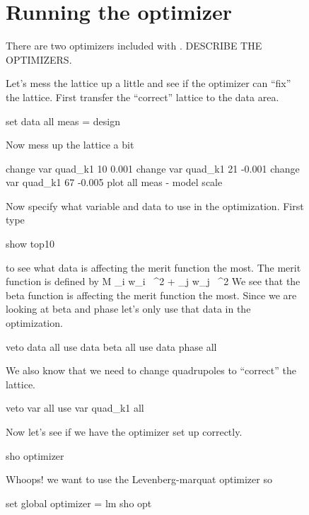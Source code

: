 \documentclass{report}
\begin{document}
\begin{figure}
\chapter{Running the optimizer}
\label{c:optimizer}

There are two optimizers included with \tao. DESCRIBE THE OPTIMIZERS.

Let's mess the lattice up a little and see if the optimizer can ``fix'' the
lattice. First transfer the ``correct'' lattice to the  data area.
\begin{example}
  set data all meas = design
\end{example}
Now mess up the lattice a bit
\begin{example}
  change var quad\_k1 10 0.001
  change var quad\_k1 21 -0.001
  change var quad\_k1 67 -0.005
  plot all meas - model
  scale
\end{example}

Now specify what variable and data to use in the optimization. First type
\begin{example}
  show top10
\end{example}
to see what data is affecting the merit function the most. The merit function is
defined by
\Begineq
  {\cal M} \equiv \sum\_{i} w\_i \,
    ^2 + 
  \sum\_{j} w\_j \,
    ^2
  \label{m1}
\Endeq
We see that the beta function is affecting the merit function the most. Since we
are looking at beta and phase let's only use that data in the optimization.
\begin{example}
  veto data all
  use  data beta all
  use  data phase all
\end{example}
We also know that we need to change quadrupoles to ``correct'' the lattice.
\begin{example}
  veto var all
  use var quad\_k1 all
\end{example}
Now let's see if we have the optimizer set up correctly.
\begin{example}
  sho optimizer
\end{example}
Whoops! we want to use the Levenberg-marquat optimizer so
\begin{example}
  set global optimizer = lm
  sho opt
\end{example}


\end{figure}
\end{document}
